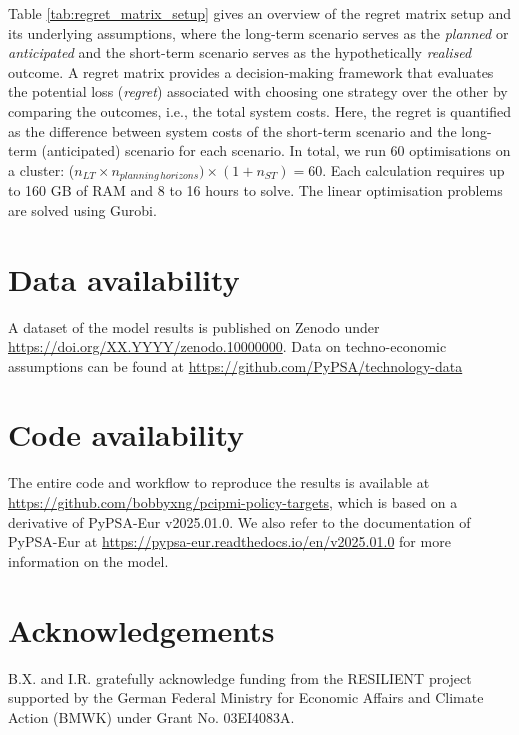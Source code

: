 \documentclass[pdflatex,sn-nature]{sn-jnl}%
\theoremstyle{thmstyleone}%
\theoremstyle{thmstyletwo}%
\theoremstyle{thmstylethree}%
\begin{document}
Table \ref{tab:regret_matrix_setup} gives an overview of the regret matrix setup and its underlying assumptions, where the long-term scenario serves as the \textit{planned} or \textit{anticipated} and the short-term scenario serves as the hypothetically \textit{realised} outcome. A regret matrix provides a decision-making framework that evaluates the potential loss (\textit{regret}) associated with choosing one strategy over the other by comparing the outcomes, i.e., the total system costs. Here, the regret is quantified as the difference between system costs of the short-term scenario and the long-term (anticipated) scenario for each scenario. 
In total, we run 60 optimisations on a cluster: ($n_{LT} \times n_{planning\,horizons}) \times (1+n_{ST}) = 60$. Each calculation requires up to 160 GB of RAM and 8 to 16 hours to solve. The linear optimisation problems are solved using Gurobi.

\clearpage

\backmatter

\section*{Data availability}
A dataset of the model results is published on Zenodo under \href{https://doi.org/XX.YYYY/zenodo.10000000}{https://doi.org/XX.YYYY/zenodo.10000000}. Data on techno-economic assumptions can be found at \href{https://github.com/PyPSA/technology-data}{https://github.com/PyPSA/technology-data}

\section*{Code availability}
The entire code and workflow to reproduce the results is available at \href{https://github.com/bobbyxng/pcipmi-policy-targets}{https://github.com/bobbyxng/pcipmi-policy-targets}, which is based on a derivative of PyPSA-Eur v2025.01.0. We also refer to the documentation of PyPSA-Eur at \href{https://pypsa-eur.readthedocs.io/en/v2025.01.0}{https://pypsa-eur.readthedocs.io/en/v2025.01.0} for more information on the model.

\section*{Acknowledgements}
B.X. and I.R. gratefully acknowledge funding from the RESILIENT project supported by the German Federal Ministry for Economic Affairs and Climate Action (BMWK) under Grant No. 03EI4083A. 
\end{document}

